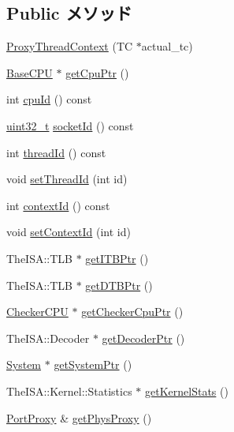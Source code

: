 \subsection*{Public メソッド}
\begin{DoxyCompactItemize}
\item 
\hyperlink{classProxyThreadContext_a08a972fa4d94c52ce3128238e1f8fbfe}{ProxyThreadContext} (TC $\ast$actual\_\-tc)
\item 
\hyperlink{classBaseCPU}{BaseCPU} $\ast$ \hyperlink{classProxyThreadContext_a4f35ce7d5cb2ec57504bc2c2bc03c879}{getCpuPtr} ()
\item 
int \hyperlink{classProxyThreadContext_a1e2d18ebf4e21f2416c21a8b072e2c7b}{cpuId} () const 
\item 
\hyperlink{Type_8hh_a435d1572bf3f880d55459d9805097f62}{uint32\_\-t} \hyperlink{classProxyThreadContext_a1ff97b43199001357718671a4d922d12}{socketId} () const 
\item 
int \hyperlink{classProxyThreadContext_afc38d04c77e7b5fc3bbb0dd00fc87742}{threadId} () const 
\item 
void \hyperlink{classProxyThreadContext_a9186b553811fbde99263b3fd831f1b0c}{setThreadId} (int id)
\item 
int \hyperlink{classProxyThreadContext_a651d5d14e7a4e95ebe6d7f5b8ee5a107}{contextId} () const 
\item 
void \hyperlink{classProxyThreadContext_a0dd10037a5b0eadaddfe7c67d52d3ac6}{setContextId} (int id)
\item 
TheISA::TLB $\ast$ \hyperlink{classProxyThreadContext_a95b7e95d0558cd03d69613142fff9137}{getITBPtr} ()
\item 
TheISA::TLB $\ast$ \hyperlink{classProxyThreadContext_a2fe6a07c44bc2a4d83b86bea605ba971}{getDTBPtr} ()
\item 
\hyperlink{classCheckerCPU}{CheckerCPU} $\ast$ \hyperlink{classProxyThreadContext_a0807ebbe39e158fdf6007ca00e3f7252}{getCheckerCpuPtr} ()
\item 
TheISA::Decoder $\ast$ \hyperlink{classProxyThreadContext_a6ae33963bc5f8b515f0a50c483f21c7f}{getDecoderPtr} ()
\item 
\hyperlink{classSystem}{System} $\ast$ \hyperlink{classProxyThreadContext_af7bdb56e0088b380302741ad9008f321}{getSystemPtr} ()
\item 
TheISA::Kernel::Statistics $\ast$ \hyperlink{classProxyThreadContext_a3faa5e314c06241296ab582bb891a06a}{getKernelStats} ()
\item 
\hyperlink{classPortProxy}{PortProxy} \& \hyperlink{classProxyThreadContext_a01ed2104c846a24a0e18594d3a2f7de9}{getPhysProxy} ()

\end{DoxyCompactItemize}
